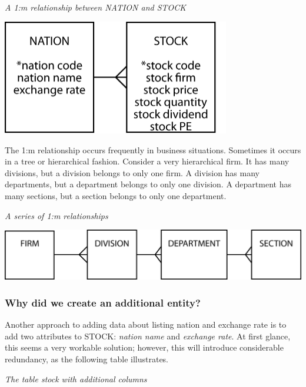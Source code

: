 \documentclass[
]{article}
\begin{document}
\emph{A 1:m relationship between NATION and STOCK}

\includegraphics[width=3.91667in,height=\textheight]{Figures/Chapter 4/nation-stock.png}

The 1:m relationship occurs frequently in business situations. Sometimes
it occurs in a tree or hierarchical fashion. Consider a very
hierarchical firm. It has many divisions, but a division belongs to only
one firm. A division has many departments, but a department belongs to
only one division. A department has many sections, but a section belongs
to only one department.

\emph{A series of 1:m relationships}

\includegraphics{Figures/Chapter 4/hierarchy.png}

\hypertarget{why-did-we-create-an-additional-entity}{%
\subsubsection{Why did we create an additional
entity?}\label{why-did-we-create-an-additional-entity}}

Another approach to adding data about listing nation and exchange rate
is to add two attributes to STOCK: \emph{nation name} and \emph{exchange
rate}. At first glance, this seems a very workable solution; however,
this will introduce considerable redundancy, as the following table
illustrates.

\emph{The table stock with additional columns}
\end{document}

